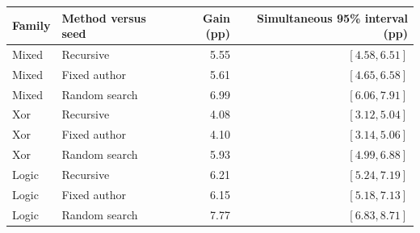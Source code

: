 \begin{tabular}{llrr}
\toprule
Family & Method versus seed & Gain (pp) & Simultaneous 95\% interval (pp) \\
\midrule
Mixed & Recursive & 5.55 & $[4.58,6.51]$ \\
Mixed & Fixed author & 5.61 & $[4.65,6.58]$ \\
Mixed & Random search & 6.99 & $[6.06,7.91]$ \\
Xor & Recursive & 4.08 & $[3.12,5.04]$ \\
Xor & Fixed author & 4.10 & $[3.14,5.06]$ \\
Xor & Random search & 5.93 & $[4.99,6.88]$ \\
Logic & Recursive & 6.21 & $[5.24,7.19]$ \\
Logic & Fixed author & 6.15 & $[5.18,7.13]$ \\
Logic & Random search & 7.77 & $[6.83,8.71]$ \\
\bottomrule
\end{tabular}
